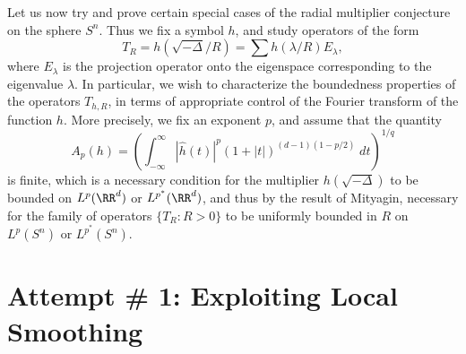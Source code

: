 Let us now try and prove certain special cases of the radial multiplier conjecture on the sphere $S^n$. Thus we fix a symbol $h$, and study operators of the form
%
\[ T_R = h \left( \sqrt{-\Delta} / R \right) = \sum h(\lambda / R) E_\lambda, \]
%
where $E_\lambda$ is the projection operator onto the eigenspace corresponding to the eigenvalue $\lambda$. In particular, we wish to characterize the boundedness properties of the operators $T_{h,R}$, in terms of appropriate control of the Fourier transform of the function $h$. More precisely, we fix an exponent $p$, and assume that the quantity
%
\[ A_p(h) = \left( \int_{-\infty}^\infty |\widehat{h}(t)|^p (1 + |t|)^{(d-1)(1 - p/2)}\; dt \right)^{1/q} \]
%
is finite, which is a necessary condition for the multiplier $h(\sqrt{-\Delta})$ to be bounded on $L^p(\RR^d)$ or $L^{p^*}(\RR^d)$, and thus by the result of Mityagin, necessary for the family of operators $\{ T_R : R > 0 \}$ to be uniformly bounded in $R$ on $L^p(S^n)$ or $L^{p^*}(S^n)$.

\section{Attempt \# 1: Exploiting Local Smoothing}

